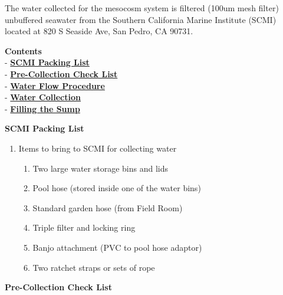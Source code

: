 \documentclass[]{book}
\providecommand{\tightlist}{%
  \setlength{\itemsep}{0pt}\setlength{\parskip}{0pt}}
\begin{document}
The water collected for the mesocosm system is filtered (100um mesh
filter) unbuffered seawater from the Southern California Marine
Institute (SCMI) located at 820 S Seaside Ave, San Pedro, CA 90731.

\textbf{Contents}\\
- \protect\hyperlink{packing_list}{\textbf{SCMI Packing List}}\\
- \protect\hyperlink{check_list}{\textbf{Pre-Collection Check List}}\\
- \protect\hyperlink{water_flow}{\textbf{Water Flow Procedure}}\\
- \protect\hyperlink{water_collection}{\textbf{Water Collection}}\\
- \protect\hyperlink{filling_the_sump}{\textbf{Filling the Sump}}

 \textbf{SCMI Packing List}

\begin{enumerate}
\def\labelenumi{\arabic{enumi}.}
\tightlist
\item
  Items to bring to SCMI for collecting water

  \begin{enumerate}
  \def\labelenumii{\arabic{enumii}.}
  \tightlist
  \item
    Two large water storage bins and lids
  \item
    Pool hose (stored inside one of the water bins)
  \item
    Standard garden hose (from Field Room)
  \item
    Triple filter and locking ring
  \item
    Banjo attachment (PVC to pool hose adaptor)
  \item
    Two ratchet straps or sets of rope
  \end{enumerate}
\end{enumerate}

 \textbf{Pre-Collection Check List}
\end{document}
